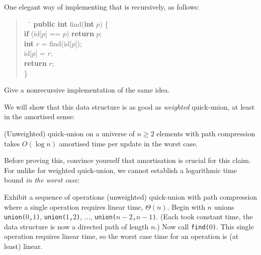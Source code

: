 \documentclass{tstextbook}
\begin{document}
One elegant way of implementing that is recursively, as follows:
\begin{quote}
\begin{tabbing}
  $\quad$\=\kill
  \textbf{public int} find(\textbf{int} $p$) \{\\
  \>  \textbf{if} (id[$p$] == $p$) \textbf{return} $p$;\\
  \>  \textbf{int} $r$ = find(id[$p$]);\\
\>  id[$p$] = $r$;\\
  \>  \textbf{return} $r$;\\
  \}
\end{tabbing}
\end{quote}

\begin{ExerciseList}
  \Exercise{} 
  Give a nonrecursive implementation of the same idea. 
\end{ExerciseList}

We will show that this data structure is as good as \emph{weighted} quick-union, at least in the amortised sense:

\begin{theorem}[Exercise 1.5.12 in SW]\label{prop: path compression}
  (Unweighted) quick-union on a universe of $n\geq 2$ elements with path compression takes $O(\log n)$ amortised time per update in the worst case.
\end{theorem}

Before proving this, convince yourself that amortisation is crucial for this claim.
For unlike for weighted quick-union, we cannot establish a logarithmic time bound \emph{in the worst case}:

\begin{ExerciseList}
  \Exercise{} Exhibit a sequence of operations (unweighted) quick-union with path compression where a single operation requires linear time, $\Theta(n)$.
  \Answer{}  Begin with $n$ unions
  \texttt{union($0$,$1$)}, 
  \texttt{union($1$,$2$)}, 
  $\ldots$, 
  \texttt{union($n-2$,$n-1$)}.
  (Each took constant time, the data structure is now a directed path of length $n$.)
  Now call \texttt{find($0$)}.
  This single operation requires linear time, so the worst case time for an operation is (at least) linear.
\end{ExerciseList}
\end{document}
